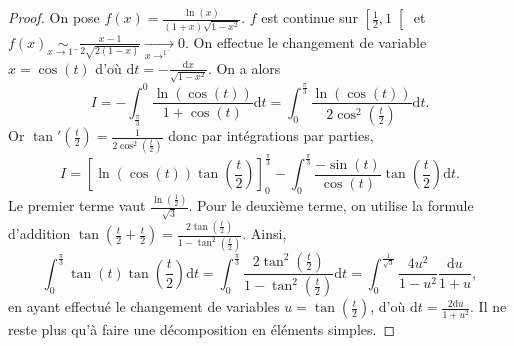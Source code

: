 \documentclass[12pt]{article}
\begin{document}
\begin{proof}
    On pose $f(x)=\frac{\ln(x)}{(1+x)\sqrt{1-x^{2}}}$. $f$ est continue sur $\left[\frac{1}{2},1\right[$ et $f(x)\underset{x\to1^{-}}{\sim}\frac{x-1}{2\sqrt{2(1-x)}}\xrightarrow[x\to^{1^{-}}]{}0$. On effectue le changement de variable $x=\cos(t)$ d'où $\mathrm{d}t=-\frac{\mathrm{d}x}{\sqrt{1-x^{2}}}$. On a alors 
    \begin{equation}
        I=-\int_{\frac{\pi}{3}}^{0}\frac{\ln(\cos(t))}{1+\cos(t)}\mathrm{d}t=\int_{0}^{\frac{\pi}{3}}\frac{\ln(\cos(t))}{2\cos^{2}\left(\frac{t}{2}\right)}\mathrm{d}t.
    \end{equation}
    Or $\tan'\left(\frac{t}{2}\right)=\frac{1}{2\cos^{2}\left(\frac{t}{2}\right)}$ donc par intégrations par parties,
    \begin{equation}
        I=\left[\ln(\cos(t))\tan\left(\frac{t}{2}\right)\right]_{0}^{\frac{\pi}{3}}-\int_{0}^{\frac{\pi}{3}}\frac{-\sin(t)}{\cos(t)}\tan\left(\frac{t}{2}\right)\mathrm{d}t.
    \end{equation}
    Le premier terme vaut $\frac{\ln(\frac{1}{2})}{\sqrt{3}}$.
    Pour le deuxième terme, on utilise la formule d'addition $\tan\left(\frac{t}{2}+\frac{t}{2}\right)=\frac{2\tan\left(\frac{t}{2}\right)}{1-\tan^{2}\left(\frac{t}{2}\right)}$. Ainsi,
    \begin{equation}
        \int_{0}^{\frac{\pi}{3}}\tan(t)\tan\left(\frac{t}{2}\right)\mathrm{d}t=\int_{0}^{\frac{\pi}{3}}\frac{2\tan^{2}\left(\frac{t}{2}\right)}{1-\tan^{2}\left(\frac{t}{2}\right)}\mathrm{d}t=\int_{0}^{\frac{1}{\sqrt{3}}}\frac{4u^{2}}{1-u^{2}}\frac{\mathrm{d}u}{1+u},
    \end{equation}
    en ayant effectué le changement de variables $u=\tan\left(\frac{t}{2}\right)$, d'où $\mathrm{d}t=\frac{2\mathrm{d}u}{1+u^{2}}$. Il ne reste plus qu'à faire une décomposition en éléments simples.
\end{proof}
\end{document}
